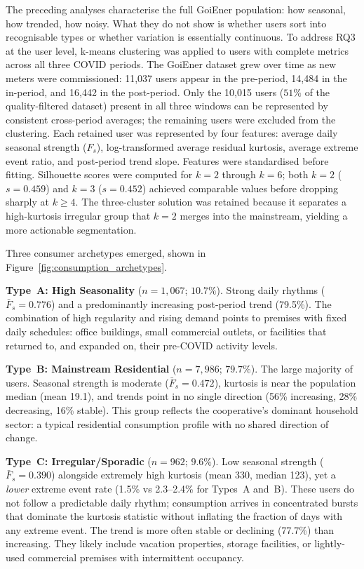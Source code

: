 ﻿\documentclass[12pt,reqno, twoside]{amsbook}
\numberwithin{figure}{chapter}
\numberwithin{table}{chapter}
\numberwithin{equation}{chapter}
\theoremstyle{plain}
\numberwithin{equation}{chapter}
\numberwithin{section}{chapter}
\begin{document}
The preceding analyses characterise the full GoiEner population: how seasonal, how trended, how noisy. What they do not show is whether users sort into recognisable types or whether variation is essentially continuous. To address RQ3 at the user level, k-means clustering \cite{macqueen_methods_1967} was applied to users with complete metrics across all three COVID periods. The GoiEner dataset grew over time as new meters were commissioned: 11,037 users appear in the pre-period, 14,484 in the in-period, and 16,442 in the post-period. Only the 10,015 users ($51\%$ of the quality-filtered dataset) present in all three windows can be represented by consistent cross-period averages; the remaining users were excluded from the clustering. Each retained user was represented by four features: average daily seasonal strength ($F_s$), log-transformed average residual kurtosis, average extreme event ratio, and post-period trend slope. Features were standardised before fitting. Silhouette scores \cite{rousseeuw_silhouettes_1987} were computed for $k = 2$ through $k = 6$; both $k=2$ ($s = 0.459$) and $k=3$ ($s = 0.452$) achieved comparable values before dropping sharply at $k \geq 4$. The three-cluster solution was retained because it separates a high-kurtosis irregular group that $k=2$ merges into the mainstream, yielding a more actionable segmentation.

Three consumer archetypes emerged, shown in Figure~\ref{fig:consumption_archetypes}.

\textbf{Type~A: High Seasonality} ($n = 1{,}067$; $10.7\%$). Strong daily rhythms ($\bar{F}_s = 0.776$) and a predominantly increasing post-period trend (79.5\%). The combination of high regularity and rising demand points to premises with fixed daily schedules: office buildings, small commercial outlets, or facilities that returned to, and expanded on, their pre-COVID activity levels.

\textbf{Type~B: Mainstream Residential} ($n = 7{,}986$; $79.7\%$). The large majority of users. Seasonal strength is moderate ($\bar{F}_s = 0.472$), kurtosis is near the population median (mean 19.1), and trends point in no single direction (56\% increasing, 28\% decreasing, 16\% stable). This group reflects the cooperative's dominant household sector: a typical residential consumption profile with no shared direction of change.

\textbf{Type~C: Irregular/Sporadic} ($n = 962$; $9.6\%$). Low seasonal strength ($\bar{F}_s = 0.390$) alongside extremely high kurtosis (mean 330, median 123), yet a \emph{lower} extreme event rate (1.5\% vs 2.3--2.4\% for Types~A and~B). These users do not follow a predictable daily rhythm; consumption arrives in concentrated bursts that dominate the kurtosis statistic without inflating the fraction of days with any extreme event. The trend is more often stable or declining (77.7\%) than increasing. They likely include vacation properties, storage facilities, or lightly-used commercial premises with intermittent occupancy.
\end{document}
